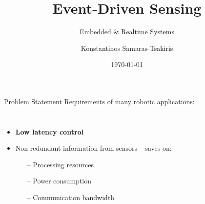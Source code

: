\documentclass[11pt,center]{beamer}
\title{\huge{Event-Driven Sensing}}
\subtitle{Embedded \& Realtime Systems}
\author{Konstantinos Samaras-Tsakiris}
\date{\today}
\begin{document}

	\begin{frame}%
		\titlepage
	\end{frame}

	\begin{frame}{Problem Statement}
		Requirements of many robotic applications:
		\pause
		\begin{columns}
			\begin{itemize}
				\item<2-> \textbf{Low latency control}
				\item<4-> Non-redundant information from sensors -- saves on:
					\begin{itemize}
						\item[--] Processing resources
						\item[--] Power consumption
						\item[--] Communication bandwidth
					\end{itemize}
			\end{itemize}
		\end{columns}
	\end{frame}
\end{document}
